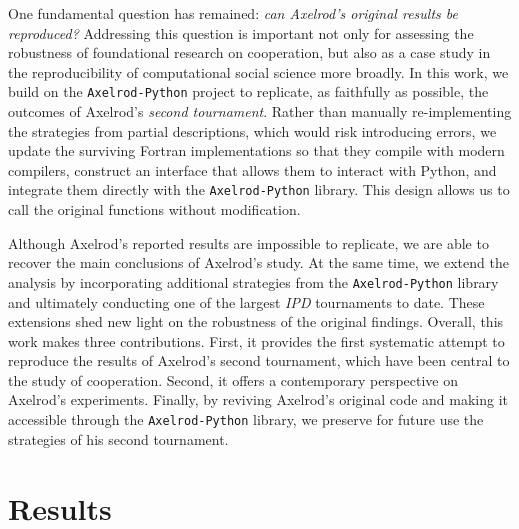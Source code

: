 \documentclass{article}
\newcommand{\IPD}{\emph{IPD}}
\newcommand{\AXL}{\texttt{Axelrod-Python}}
\providecommand{\DIFaddtex}[1]{{\protect\color{blue}\uwave{#1}}} %
\providecommand{\DIFaddbegin}{} %
\providecommand{\DIFaddend}{} %
\providecommand{\DIFadd}[1]{\texorpdfstring{\DIFaddtex{#1}}{#1}} %
\newcommand{\DIFaddincludegraphics}[2][]{{\color{blue}\fbox{\DIFOincludegraphics[#1]{#2}}}} %
\DeclareRobustCommand{\DIFaddbegin}{\DIFOaddbegin \let\includegraphics\DIFaddincludegraphics} %
\DeclareRobustCommand{\DIFaddend}{\DIFOaddend \let\includegraphics\DIFOincludegraphics} %
\begin{document}
One fundamental question has remained: \emph{can Axelrod's original results be
reproduced?} Addressing this question is important not only for assessing the
robustness of foundational research on cooperation, but also as a case study in
the reproducibility of computational social science more broadly. In this work, we
build on the \AXL{} project to replicate, as faithfully as possible, the
outcomes of Axelrod's \emph{second tournament}. Rather than manually
re-implementing the strategies from partial descriptions, which would risk
introducing errors, we update the surviving Fortran implementations so that they
compile with modern compilers, construct an interface that allows them to
interact with Python, and integrate them directly with the \AXL{} library. This
design allows us to call the original functions without modification.

Although Axelrod's reported results are impossible to replicate, we are able
to recover the main conclusions of Axelrod's study. At the same time, we extend
the analysis by incorporating additional strategies from the \AXL{}
library and ultimately conducting one of the largest \IPD{} tournaments to
date. These extensions shed new light on the robustness
of the original findings. Overall,
this work makes three contributions. First, it provides the first systematic
attempt to reproduce the results of Axelrod's second tournament, which have been
central to the study of cooperation. Second, it offers a contemporary
perspective on Axelrod's experiments. Finally, by reviving Axelrod's
original code and making it accessible through the \AXL{} library, we preserve
for future use the strategies of his second tournament.

\section*{Results}\label{sec:reviving}

\DIFaddbegin \subsection*{\DIFadd{Reviving the tournament.}}
\DIFaddend 
\end{document}
